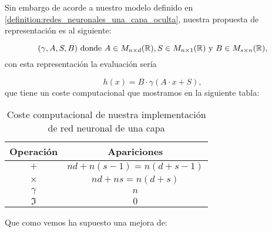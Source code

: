 Sin embargo de acorde a nuestro modelo definido en \ref{definition:redes_neuronales_una_capa_oculta}, nuestra propuesta de representación es al siguiente: 

\begin{equation}
    (\gamma, A, S, B) 
    \text{ donde } 
    A \in M_{n \times d}(\mathbb{R}), 
    S\in M_{n \times 1}(\mathbb{R}) 
    \text{ y }
    B \in M_{s \times n}(\mathbb{R}),
\end{equation}
con esta representación la evaluación sería

\begin{equation}
    h(x) =  B \cdot
        \gamma \left( 
            A
            \cdot 
            x
            + S
        \right),
\end{equation}
que tiene un coste computacional que mostramos en la siguiente tabla: 
\begin{table}[h]
    \begin{center}
    \begin{tabular}{| c | c |}
    \hline
    Operación & Apariciones  \\ \hline
    $+$ & $n d+n(s-1) = n(d+s-1)$  \\
    $\times$ & $n d+n s = n(d+s)$  \\
    $\gamma$ & $n$  \\
    $\mathfrak{I}$ & $0$  \\
    \hline
    \end{tabular}
    \caption{Coste computacional de nuestra implementación de red neuronal de una capa}
    \label{tab:coste computacional nuestr modelo red neuronal}
    \end{center}
\end{table}

Que como vemos ha supuesto una mejora de:

\begin{table}[h]
    \centering
    \caption{Comparativas de coste computacional entre la implementación usual de una red neuronal y la nuestra}
    \label{tab:comparativas coste red neuronal }
\end{table}

